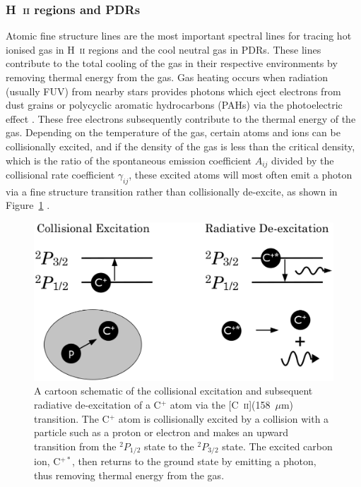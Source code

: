 \subsubsection{H~\textsc{ii} regions and PDRs}\label{fine_lines}
Atomic fine structure lines are the most important spectral lines for tracing hot ionised gas in H~\textsc{ii} regions and the cool neutral gas in PDRs.  These lines contribute to the total cooling of the gas in their respective environments by removing thermal energy from the gas.  Gas heating occurs when radiation (usually FUV) from nearby stars provides photons which eject electrons from dust grains or polycyclic aromatic hydrocarbons (PAHs) via the photoelectric effect \citep{1985ApJ...291..722T,1991ApJ...377..192H}.  These free electrons subsequently contribute to the thermal energy of the gas.  Depending on the temperature of the gas, certain atoms and ions can be collisionally excited, and if the density of the gas is less than the critical density, which is the ratio of the spontaneous emission coefficient $A_{ij}$ divided by the collisional rate coefficient $\gamma_{ij}$, these excited atoms will most often emit a photon via a fine structure transition rather than collisionally de-excite, as shown in Figure~\ref{fig:cooling} \citep{2005pcim.book.....T}.

\begin{figure}[!h]
 \begin{center}
 \includegraphics[width=\columnwidth]{ch1/cooling_line_schematic.eps}
  \caption[A cartoon of the cooling process via the \mbox{[C~\textsc{ii}](158~$\mu$m)} fine structure line]{A cartoon schematic of the collisional excitation and subsequent radiative de-excitation of a C$^{+}$ atom via the [C~\textsc{ii}](158~$\mu$m) transition.  The C$^{+}$ atom is collisionally excited by a collision with a particle such as a proton or electron and makes an upward transition from the $^{2}P_{1/2}$ state to the $^{2}P_{3/2}$ state.  The excited carbon ion, C$^{+*}$, then returns to the ground state by emitting a photon, thus removing thermal energy from the gas.
  \label{fig:cooling}}
 \end{center}
\end{figure}


